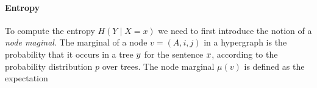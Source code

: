   \paragraph{Entropy}
    To compute the entropy $H(Y \mid X = x)$ we need to first introduce the notion of a \textit{node maginal}. The marginal of a node $v = (A, i, j)$ in a hypergraph is the probability that it occurs in a tree $y$ for the sentence $x$, according to the probability distribution $p$ over trees. The node marginal $\mu(v)$ is defined as the expectation
